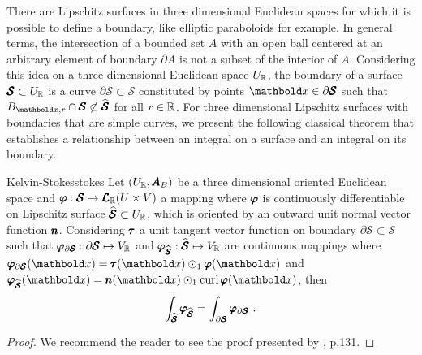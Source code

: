 There are Lipschitz surfaces in three dimensional Euclidean spaces for which it is possible to define a boundary, like elliptic paraboloids for example. In general terms, the intersection of a bounded set $A$ with an open ball centered at an arbitrary element of boundary $\partial A$ is not a subset of the interior of $A$. Considering this idea on a three dimensional Euclidean space $U_{\mathbb{R}}$, the boundary of a surface $\pmb{\mathcal{S}}\subset U_{\mathbb{R}}$ is a curve $\partial\pmb{\mathcal{S}}\subset\pmb{\mathcal{S}}$ constituted by points $\vto{x}\in\partial\pmb{\mathcal{S}}$ such that $B_{\vto{x},r}\cap\pmb{\mathcal{S}}\not\subset\widehat{\pmb{\mathcal{S}}}$ for all $r\in\mathbb{R}$. For three dimensional Lipschitz surfaces with boundaries that are simple curves, we present the following classical theorem that establishes a relationship between an integral on a surface and an integral on its boundary.

\begin{mteo}{Kelvin-Stokes}{stokes}
Let $(U_{\mathbb{R}},\pmb{A}_B)$ be a three dimensional oriented Euclidean space and $\pmb{\varphi} : \pmb{\mathcal{S}} \mapsto \pmb{\mathcal{L}}_{\mathbb{R}}(U\times V)$ a mapping where  $\pmb{\varphi}$ is continuously differentiable on Lipschitz surface $\widehat{\pmb{\mathcal{S}}}\subset U_{\mathbb{R}}$, which is oriented by an outward unit normal vector function $\pmb{n}$. Considering $\pmb{\tau}$ a unit tangent vector function on boundary $\partial\pmb{\mathcal{S}}\subset\pmb{\mathcal{S}}$ such that $\pmb{\varphi}_{\partial\pmb{\mathcal{S}}} : \partial\pmb{\mathcal{S}} \mapsto V_{\mathbb{R}}$ and $\pmb{\varphi}_{\widehat{\pmb{\mathcal{S}}}} : \widehat{\pmb{\mathcal{S}}} \mapsto V_{\mathbb{R}}$ are continuous mappings where $\fua{\vtf{\varphi}_{\partial\pmb{\mathcal{S}}}}{\vto{x}}=\fua{\vtf{\tau}}{\vto{x}}\odot_1\fua{\vtf{\varphi}}{\vto{x}}$ and $\fua{\vtf{\varphi}_{\widehat{\pmb{\mathcal{S}}}}}{\vto{x}}=\fua{\vtf{n}}{\vto{x}}\odot_1\fua{\crl{\vtf{\varphi}}}{\vto{x}}$, then
\begin{equation*}
\int_{\widehat{{\pmb{\mathcal{S}}}}}\pmb{\varphi}_{\widehat{\pmb{\mathcal{S}}}} = \int_{\partial{\pmb{\mathcal{S}}}}\pmb{\varphi}_{\partial\pmb{\mathcal{S}}}\,\,.
\end{equation*}
\end{mteo}
{\footnotesize
\begin{proof}
We recommend the reader to see the proof presented by \cite{backus_1997_1}, p.131. 
\end{proof}
}

